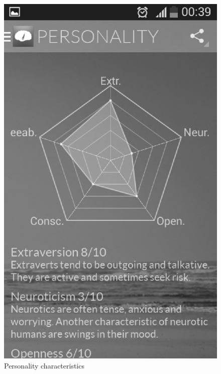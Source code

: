 \begin{figure}[h]
\centering
\begin{minipage}{.5\textwidth}
  \centering
  \includegraphics [width=.8\textwidth]{images/Menthal_GUI_personality}
  \caption{Personality characteristics}
  \label{fig:menthal_gui_personality}
\end{minipage}%
\begin{minipage}{.5\textwidth}
  \centering

\end{minipage}
\end{figure}
